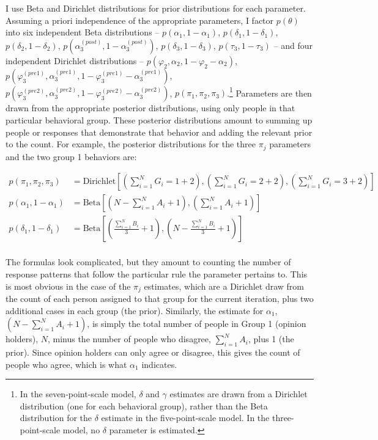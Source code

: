 \documentclass[12pt,]{article}
\begin{document}
I use Beta and Dirichlet distributions for prior distributions for each parameter. Assuming a priori independence of the appropriate parameters, I factor \(p(\theta)\) into six independent Beta distributions -- \(p(\alpha_1, 1-\alpha_1)\), \(p(\delta_1, 1-\delta_1)\), \(p(\delta_2, 1-\delta_2)\), \(p(\alpha_3^{(post)}, 1-\alpha_3^{(post)})\), \(p(\delta_3, 1-\delta_3)\), \(p(\tau_3, 1-\tau_3)\) -- and four independent Dirichlet distributions -- \(p(\varphi_2, \alpha_2, 1-\varphi_2-\alpha_2)\), \(p(\varphi_3^{(pre1)}, \alpha_3^{(pre1)}, 1-\varphi_3^{(pre1)}-\alpha_3^{(pre1)})\), \(p(\varphi_3^{(pre2)}, \alpha_3^{(pre2)}, 1-\varphi_3^{(pre2)}-\alpha_3^{(pre2)})\), \(p(\pi_1, \pi_2, \pi_3)\).\footnote{In the seven-point-scale model, \(\delta\) and \(\gamma\) estimates are drawn from a Dirichlet distribution (one for each behavioral group), rather than the Beta distribution for the \(\delta\) estimate in the five-point-scale model. In the three-point-scale model, no \(\delta\) parameter is estimated.} Parameters are then drawn from the appropriate posterior distributions, using only people in that particular behavioral group. These posterior distributions amount to summing up people or responses that demonstrate that behavior and adding the relevant prior to the count. For example, the posterior distributions for the three \(\pi_j\) parameters and the two group 1 behaviors are:

\begin{align*}
p(\pi_1, \pi_2, \pi_3)&=\text{Dirichlet}[(\sum_{i=1}^N G_i=1 + 2), (\sum_{i=1}^N G_i=2 + 2), (\sum_{i=1}^N G_i=3 + 2)] \\
p(\alpha_1, 1-\alpha_1)&=\text{Beta}[(N - \sum_{i=1}^N A_i + 1), (\sum_{i=1}^N A_i + 1)] \\
p(\delta_1, 1-\delta_1)&=\text{Beta}[(\frac{\sum_{i=1}^N B_i}{3} + 1), (N - \frac{\sum_{i=1}^N B_i}{3} + 1)] \\
\end{align*}

The formulas look complicated, but they amount to counting the number of response patterns that follow the particular rule the parameter pertains to. This is most obvious in the case of the \(\pi_j\) estimates, which are a Dirichlet draw from the count of each person assigned to that group for the current iteration, plus two additional cases in each group (the prior). Similarly, the estimate for \(\alpha_1\), \((N - \sum_{i=1}^N A_i + 1)\), is simply the total number of people in Group 1 (opinion holders), \(N\), minus the number of people who disagree, \(\sum_{i=1}^N A_i\), plus 1 (the prior). Since opinion holders can only agree or disagree, this gives the count of people who agree, which is what \(\alpha_1\) indicates.
\end{document}
